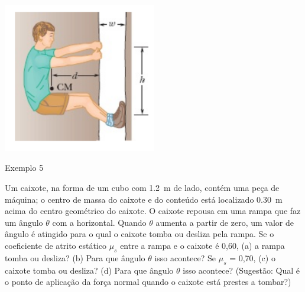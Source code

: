 \begin{frame}{}
    \begin{center}
        \includegraphics[width=0.5\textwidth]{images/Captura de tela de 2022-11-02 18-04-44.png}
    \end{center}
\end{frame}

\begin{frame}{Exemplo 5}
    \begin{minipage}{\textwidth}
        Um caixote, na forma de um cubo com \SI{1,2}{m} de lado, contém uma peça de máquina; o centro de
        massa do caixote e do conteúdo está localizado \SI{0,30}{m} acima do centro geométrico do caixote. O caixote
        repousa em uma rampa que faz um ângulo \(\theta\) com a horizontal. Quando \(\theta\) aumenta a partir de zero, um
        valor de ângulo é atingido para o qual o caixote tomba ou desliza pela rampa. Se o coeficiente de atrito
        estático \(\mu_s\) entre a rampa e o caixote é 0,60, (a) a rampa tomba ou desliza? (b) Para que ângulo \(\theta\) isso
        acontece? Se \(\mu_s\) = 0,70, (c) o caixote tomba ou desliza? (d) Para que ângulo \(\theta\) isso acontece? (Sugestão:
        Qual é o ponto de aplicação da força normal quando o caixote está prestes a tombar?)
    \end{minipage}
\end{frame}
